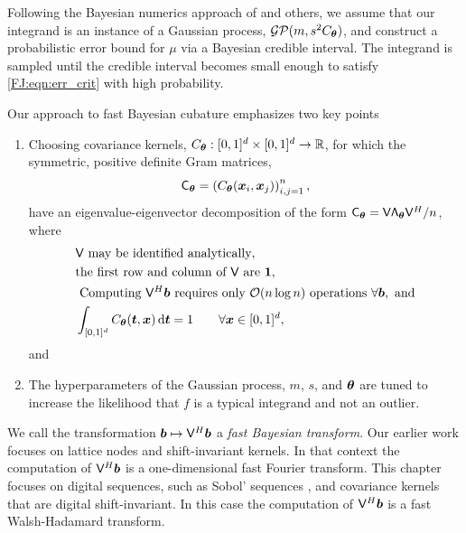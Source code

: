 \documentclass[graybox,footinfo]{svmult}
\begin{document}
Following the Bayesian numerics approach of \cite{BriEtal18a, Dia88a, OHa91a, RasGha03a} and others, we assume that our integrand is an instance of a Gaussian process, $\mathcal{GP}(m,s^2 C_{\boldsymbol{\theta}})$, and construct a probabilistic error bound for $\mu$ via a Bayesian credible interval.  The integrand is sampled until the credible interval becomes small enough to satisfy \eqref{FJ:eqn:err_crit} with high probability.  

Our approach to fast Bayesian cubature \cite{RatHic19a} emphasizes two key points
\begin{enumerate}
\renewcommand{\labelenumi}{\roman{enumi})}
    \item Choosing covariance kernels, $C_{\boldsymbol{\theta}}:[0,1]^d \times [0,1]^d \to {\mathbb{R}}$, for which the symmetric, positive definite Gram matrices, 
    \begin{equation} \label{FJ:eq:Gram}
        \mathsf{C}_\bstheta = \left(  C_\bstheta(\bsx_i,\bsx_j)  \right)_{i,j=1}^n,
    \end{equation}
    have an eigenvalue-eigenvector decomposition of the form $\mathsf{C}_{\boldsymbol{\theta}} = \mathsf{V} \mathsf{\Lambda}_{\boldsymbol{\theta}} \mathsf{V}^H/n$, where
    \begin{subequations} \label{FJ:eq:fastcompAssump}
	\begin{align}
	\label{FJ:eq:fastcompAssumpA}
	& \mathsf{V} \text{ may be identified analytically}, \\
	\label{FJ:eq:fastcompAssumpB}
	& \text{the first row and column of $\mathsf{V}$ are } \bsone, \\
	\label{FJ:eq:fastcompAssumpC}
	& \text{ Computing $\mathsf{V}^H \bsb$ requires only $\calO(n \log n)$ operations } \forall \bsb, \text{ and} \\
	\label{FJ:addAssump}
    & \int_{[0,1]^d} C_\bstheta(\bst,\bsx) \, \D \bst = 1 \qquad \forall \bsx \in [0,1]^d,
	\end{align}
\end{subequations}
and
\item The hyperparameters of the Gaussian process, $m$, $s$, and ${\boldsymbol{\theta}}$ are tuned to increase the likelihood that $f$ is a typical integrand and not an outlier.
\end{enumerate}
We call the transformation ${\boldsymbol{b}} \mapsto \mathsf{V}^H {\boldsymbol{b}}$ a \emph{fast Bayesian transform}. Our earlier work \cite{RatHic19a} focuses on lattice nodes and shift-invariant kernels. In that context the computation of $\mathsf{V}^H {\boldsymbol{b}}$ is a one-dimensional fast Fourier transform.  This chapter focuses on digital sequences, such as Sobol' sequences \cite{Sob67}, and covariance kernels that are digital shift-invariant.  In this case the computation of $\mathsf{V}^H {\boldsymbol{b}}$ is a fast Walsh-Hadamard transform. 
\end{document}

